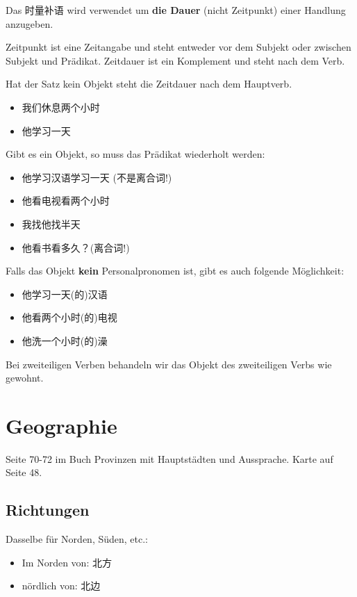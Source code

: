 \documentclass[UTF8]{ctexart}
\begin{document}
Das 时量补语 wird verwendet um \textbf{die Dauer} (nicht Zeitpunkt) einer Handlung anzugeben.

Zeitpunkt ist eine Zeitangabe und steht entweder vor dem Subjekt oder zwischen Subjekt
und Prädikat. Zeitdauer ist ein Komplement und steht nach dem Verb.

Hat der Satz kein Objekt steht die Zeitdauer nach dem Hauptverb.

\begin{itemize}
    \item 我们休息两个小时
    \item 他学习一天
\end{itemize}

Gibt es ein Objekt, so muss das Prädikat wiederholt werden:

\begin{itemize}
    \item 他学习汉语学习一天 (不是离合词!)
    \item 他看电视看两个小时
    \item 我找他找半天
    \item 他看书看多久？(离合词!)
\end{itemize}

Falls das Objekt \textbf{kein} Personalpronomen ist, gibt es auch folgende Möglichkeit:

\begin{itemize}
    \item 他学习一天(的)汉语
    \item 他看两个小时(的)电视
    \item 他洗一个小时(的)澡
\end{itemize}

Bei zweiteiligen Verben behandeln wir das Objekt des zweiteiligen Verbs wie gewohnt.

\section{Geographie}

Seite 70-72 im Buch Provinzen mit Hauptstädten und Aussprache. Karte auf Seite 48.


\subsection{Richtungen}

Dasselbe für Norden, Süden, etc.:

\begin{itemize}
    \item Im Norden von: 北方
    \item nördlich von: 北边
\end{itemize}
\end{document}
